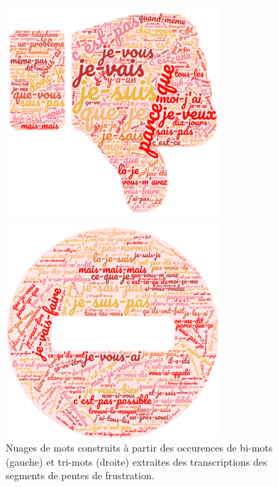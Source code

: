 \begin{figure}[h]
  \centering
  \begin{minipage}[b]{0.49\linewidth}
      \center
      \centerline{\includegraphics[width=8cm]{./Chapitre7/figures/bigram_pentu.png}}
  \end{minipage}
  \begin{minipage}[b]{0.49\linewidth}
      \center
      \centerline{\includegraphics[width=8cm]{./Chapitre7/figures/trigram_pentu.png}}
  \end{minipage}
    \caption{Nuages de mots construits à partir des occurences de bi-mots (gauche) et tri-mots (droite) extraites des transcriptions des segments de pentes de frustration.}
    \label{fig:nuageMot}
\end{figure}
